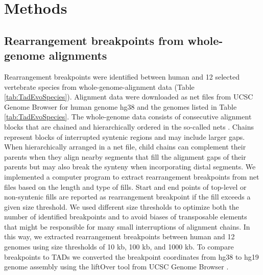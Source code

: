 \documentclass[a4paper,twoside=true,openright,parskip=full,chapterprefix=true,11pt,headings=normal,bibliography=totoc,listof=totoc,titlepage=on,captions=tableabove,draft=false]{scrreprt}
\theoremstyle{definition}
\theoremstyle{definition}
\theoremstyle{definition}
\theoremstyle{remark}
\begin{document}
\section{Methods}\label{methods}

\subsection{Rearrangement breakpoints from whole-genome
alignments}\label{rearrangement-breakpoints-from-whole-genome-alignments}

Rearrangement breakpoints were identified between human and 12 selected
vertebrate species from whole-genome-alignment data (Table
\ref{tab:TadEvoSpecies}). Alignment data were downloaded as net files
from UCSC Genome Browser for human genome hg38 and the genomes listed in
Table \ref{tab:TadEvoSpecies}. The whole-genome data consists of
consecutive alignment blocks that are chained and hierarchically ordered
in the so-called nets \citep{Kent2003}. Chains represent blocks of
interrupted syntenic regions and may include larger gaps. When
hierarchically arranged in a net file, child chains can complement their
parents when they align nearby segments that fill the alignment gaps of
their parents but may also break the synteny when incorporating distal
segments. We implemented a computer program to extract rearrangement
breakpoints from net files based on the length and type of fills. Start
and end points of top-level or non-syntenic fills are reported as
rearrangement breakpoint if the fill exceeds a given size threshold. We
used different size thresholds to optimize both the number of identified
breakpoints and to avoid biases of transposable elements that might be
responsible for many small interruptions of alignment chains. In this
way, we extracted rearrangement breakpoints between human and 12 genomes
using size thresholds of 10 kb, 100 kb, and 1000 kb. To compare
breakpoints to TADs we converted the breakpoint coordinates from hg38 to
hg19 genome assembly using the liftOver tool from UCSC Genome Browser
\citep{Hinrichs2006}.
\end{document}
